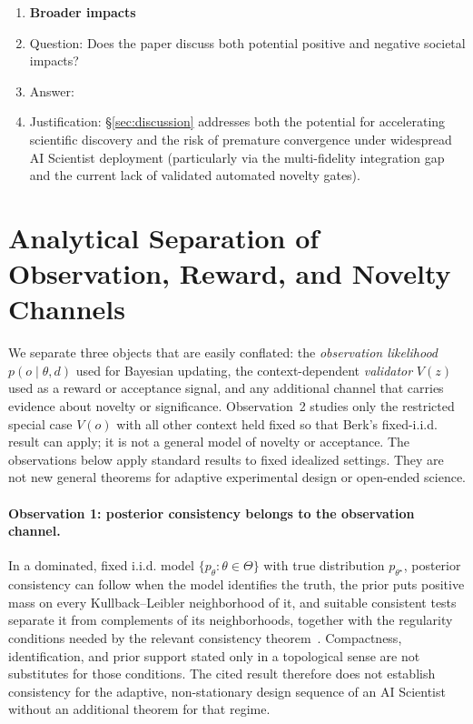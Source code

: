 \documentclass{article}
\begin{document}
\begin{enumerate}
\item {\bf Broader impacts}
    \item[] Question: Does the paper discuss both potential positive and negative societal impacts?
    \item[] Answer: \answerYes{}
    \item[] Justification: \S\ref{sec:discussion} addresses both the potential for accelerating scientific discovery and the risk of premature convergence under widespread AI Scientist deployment (particularly via the multi-fidelity integration gap and the current lack of validated automated novelty gates).

\end{enumerate}

\appendix
\section{Analytical Separation of Observation, Reward, and Novelty Channels}
\label{app:vformal}

We separate three objects that are easily conflated: the \emph{observation likelihood} $p(o \mid \theta,d)$ used for Bayesian updating, the context-dependent \emph{validator} $V(z)$ used as a reward or acceptance signal, and any additional channel that carries evidence about novelty or significance. Observation~2 studies only the restricted special case $V(o)$ with all other context held fixed so that Berk's fixed-i.i.d. result can apply; it is not a general model of novelty or acceptance. The observations below apply standard results to fixed idealized settings. They are not new general theorems for adaptive experimental design or open-ended science.

\paragraph{Observation 1: posterior consistency belongs to the observation channel.}
In a dominated, fixed i.i.d. model $\{p_\theta:\theta\in\Theta\}$ with true distribution $p_{\theta^\star}$, posterior consistency can follow when the model identifies the truth, the prior puts positive mass on every Kullback--Leibler neighborhood of it, and suitable consistent tests separate it from complements of its neighborhoods, together with the regularity conditions needed by the relevant consistency theorem~\citep{ghosal2017fundamentals}. Compactness, identification, and prior support stated only in a topological sense are not substitutes for those conditions. The cited result therefore does not establish consistency for the adaptive, non-stationary design sequence of an AI Scientist without an additional theorem for that regime.
\end{document}
